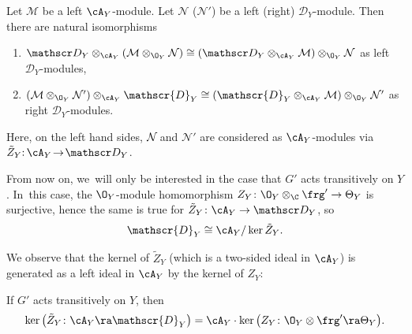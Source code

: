 \begin{lem}[{\cite[Th.\,A.6 \& Cor.\,A.2]{CN05}}] \label{lem:tensorProductsOnAandD}
Let $\mathcal M$ be a left $\cA_Y$\nobreakdash-mod\-ule. Let $\mathcal N$ (\resp $\mathcal N'$) be a left (\resp right) $\mathscr{D}_Y$\nobreakdash-mod\-ule. Then there are natural isomorphisms
\begin{enumerate}
\item $\mathscr D_Y \otimes_{\cA_Y} (\mathcal M \otimes_{\O_Y} \mathcal N) \cong (\mathscr D_Y \otimes_{\cA_Y} \mathcal M) \otimes_{\O_Y} \mathcal N$ as left $\mathscr{D}_Y$\nobreakdash-mod\-ules, \label{item:leftCNMN}
\item $(\mathcal M \otimes_{\O_Y} \mathcal N') \otimes_{\cA_Y} \mathscr{D}_Y \cong (\mathscr{D}_Y \otimes_{\cA_Y} \mathcal M) \otimes_{\O_Y} \mathcal N'$ as right $\mathscr D_Y$\nobreakdash-mod\-ules. \label{item:rightCNMN}
\end{enumerate}
Here, on the left hand sides, $\mathcal N\mkern-3mu$ and $\mathcal N'$ are considered as $\cA_Y$\nobreakdash-mod\-ules via~\hbox{$\tilde Z_Y{:}\, \cA_Y\!\to\! \mathscr D_Y$}.
\end{lem}

From now on, we~will only be interested in the case that $G'$ acts transitively on $Y$. In~this case, the $\O_Y$\nobreakdash-mod\-ule homomorphism $Z_Y \colon \O_Y \otimes_\C \frg' \to \Theta_Y$ is surjective, hence the same is true for $\tilde{Z}_Y \colon \cA_Y \to \mathscr D_Y$, so
\[
\mathscr{D}_Y \cong \cA_Y/\ker \tilde Z_Y.
\]

We observe that the kernel of $\tilde Z_Y$ (which is a two-sided ideal in $\cA_Y$) is generated as a left ideal in $\cA_Y$ by the kernel of $Z_Y$:

\begin{lem}
\label{lem:kernelGeneratedByVFs}
If $G'$ acts transitively on $Y$, then
\[
\ker\big(\tilde{Z}_Y \colon \cA_Y \ra \mathscr{D}_Y\big) = \cA_Y \cdot \ker\big(Z_Y \colon \O_Y \otimes \frg' \ra \Theta_Y\big).
\]
\end{lem}

